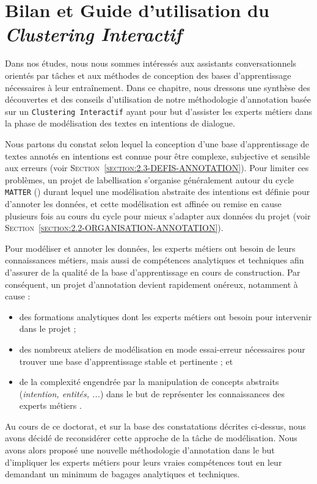 \chapter{Bilan et Guide d'utilisation du \textit{Clustering Interactif}}
\label{chapter:5-GUIDE}
	
	Dans nos études, nous nous sommes intéressés aux assistants conversationnels orientés par tâches et aux méthodes de conception des bases d'apprentissage nécessaires à leur entraînement.
	Dans ce chapitre, nous dressons une synthèse des découvertes et des conseils d'utilisation de notre méthodologie d'annotation basée sur un \texttt{Clustering Interactif} ayant pour but d'assister les experts métiers dans la phase de modélisation des textes en intentions de dialogue.
	
	\begin{leftBarReminder}
		Nous partons du constat selon lequel la conception d'une base d'apprentissage de textes annotés en intentions est connue pour être complexe, subjective et sensible aux erreurs (voir \textsc{Section~\ref{section:2.3-DEFIS-ANNOTATION}}).
		Pour limiter ces problèmes, un projet de labellisation s'organise généralement autour du cycle \texttt{MATTER} (\cite{pustejovsky-stubbs:2012:natural-language-annotation}) durant lequel une modélisation abstraite des intentions est définie pour d'annoter les données, et cette modélisation est affinée ou remise en cause plusieurs fois au cours du cycle pour mieux s'adapter aux données du projet (voir \textsc{Section~\ref{section:2.2-ORGANISATION-ANNOTATION}}).
		
		Pour modéliser et annoter les données, les experts métiers ont besoin de leurs connaissances métiers, mais aussi de compétences analytiques et techniques afin d'assurer de la qualité de la base d'apprentissage en cours de construction.
		Par conséquent, un projet d'annotation devient rapidement onéreux, notamment à cause :
		\begin{itemize}
			\item des formations analytiques dont les experts métiers ont besoin pour intervenir dans le projet ;
			\item des nombreux ateliers de modélisation en mode essai-erreur nécessaires pour trouver une base d'apprentissage stable et pertinente ; et
			\item de la complexité engendrée par la manipulation de concepts abstraits (\textit{intention, entités, ...}) dans le but de représenter les connaissances des experts métiers .
		\end{itemize}
		
		Au cours de ce doctorat, et sur la base des constatations décrites ci-dessus, nous avons décidé de reconsidérer cette approche de la tâche de modélisation.
		Nous avons alors proposé une nouvelle méthodologie d'annotation dans le but d'impliquer les experts métiers pour leurs vraies compétences tout en leur demandant un minimum de bagages analytiques et techniques.
	\end{leftBarReminder}
	
